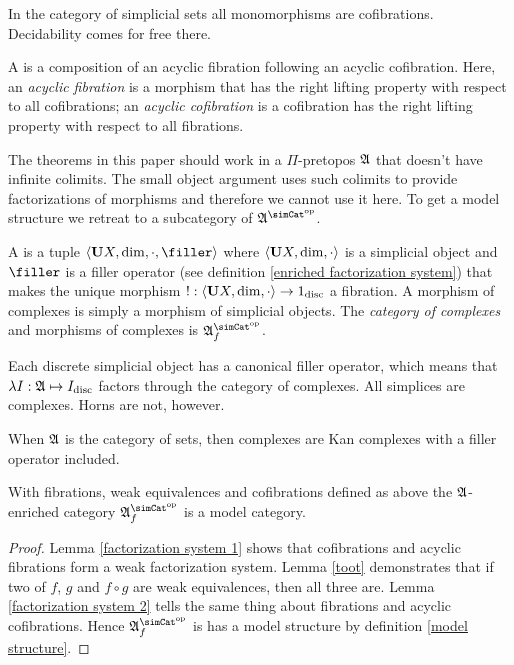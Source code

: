 \documentclass[csh.tex]{subfiles}
\begin{document}
\begin{example} In the category of simplicial sets all monomorphisms are cofibrations. Decidability comes for free there.\end{example}

\begin{definition} A  is a composition of an acyclic fibration following an acyclic cofibration. Here, an \emph{acyclic fibration} is a morphism that has the right lifting property with respect to all cofibrations; an \emph{acyclic cofibration} is a cofibration has the right lifting property with respect to all fibrations.
\end{definition}

The theorems in this paper should work in a $\Pi$-pretopos $\mathfrak A$ that doesn't have infinite colimits. The small object argument uses such colimits to provide factorizations of morphisms and therefore we cannot use it here. To get a model structure we retreat to a subcategory of $\ambient\s$.

\begin{definition} A  is a tuple $\tuplet{\base X,\dim,\cdot,\filler}$ where $\left\langle \mathbf{U} X,\dim,\cdot \right\rangle$ is a simplicial object and $\filler$ is a filler operator (see definition \ref{enriched factorization system}) that makes the unique morphism $!: \left\langle \mathbf{U} X,\dim,\cdot \right\rangle\to 1_{\rm disc}$ a fibration. A morphism of complexes is simply a morphism of simplicial objects. The \emph{category of complexes} and morphisms of complexes is $\ambient\s\f$.
\end{definition}

\begin{example} Each discrete simplicial object has a canonical filler operator, which means that $\lambda I:\mathfrak A \mapsto I_{\rm disc}$ factors through the category of complexes. All simplices are complexes. Horns are not, however.
\end{example}

\begin{example} When $\mathfrak A$ is the category of sets, then complexes are Kan complexes with a filler operator included. \end{example}

\begin{theorem}
With fibrations, weak equivalences and cofibrations defined as above the $\mathfrak A$-enriched category $\ambient\s\f$ is a model category.
\label{model category}
\end{theorem}

\begin{proof}
Lemma \ref{factorization system 1} shows that cofibrations and acyclic fibrations form a weak factorization system. Lemma \ref{toot} demonstrates that if two of $f$, $g$ and $f\circ g$ are weak equivalences, then all three are. Lemma \ref{factorization system 2} tells the same thing about fibrations and acyclic cofibrations. Hence $\ambient\s\f$ is has a model structure by definition \ref{model structure}.
\end{proof}
\end{document}
